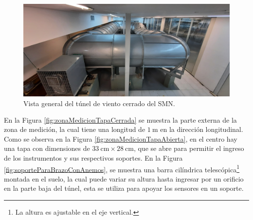 \begin{figure}[H]
    \centering
    \includegraphics[width=0.9\linewidth]{Figuras/viento/tunelDeViento/tuneDeViento2.jpg}
    \caption{Vista general del túnel de viento cerrado del SMN.}
    \label{fig:tuneDeViento2}
\end{figure}

En la Figura \ref{fig:zonaMedicionTapaCerrada} se muestra la parte externa de la zona de medición, la cual tiene una longitud de $\SI{1}{\meter}$ en la dirección longitudinal. Como se observa en la Figura \ref{fig:zonaMedicionTapaAbierta}, en el centro hay una tapa con dimensiones de $\SI{33}{\centi\meter} \times \SI{28}{\centi\meter}$, que se abre para permitir el ingreso de los instrumentos y sus respectivos soportes. En la Figura \ref{fig:soporteParaBrazoConAnemos}, se muestra una barra cilíndrica telescópica\footnote{La altura es ajustable en el eje vertical.} montada en el suelo, la cual puede variar su altura hasta ingresar por un orificio en la parte baja del túnel, esta se utiliza para apoyar los sensores en un soporte.


